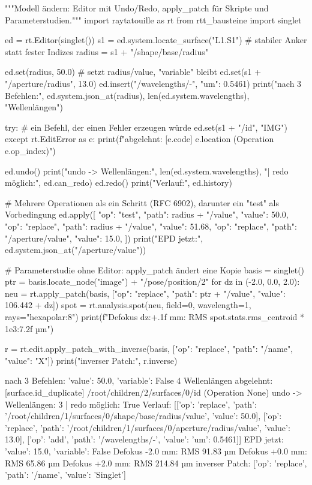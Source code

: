 \documentclass[11pt,a4paper,openany]{book}
\DeclareRobustCommand{\code}[1]{\texttt{\directlua{rttcode("\luaescapestring{\detokenize{#1}}")}}}
\begin{document}
\begin{pycode}[title={\code{ex04_aendern.py}}]
"""Modell ändern: Editor mit Undo/Redo, apply_patch für Skripte und Parameterstudien."""
import raytatouille as rt
from rtt_bausteine import singlet

ed = rt.Editor(singlet())
s1 = ed.system.locate_surface("L1.S1")          # stabiler Anker statt fester Indizes
radius = s1 + "/shape/base/radius"

ed.set(radius, 50.0)                            # setzt radius/value, "variable" bleibt
ed.set(s1 + "/aperture/radius", 13.0)
ed.insert("/wavelengths/-", {"um": 0.5461})
print("nach 3 Befehlen:", ed.system.json_at(radius), len(ed.system.wavelengths), "Wellenlängen")

try:                                            # ein Befehl, der einen Fehler erzeugen würde
    ed.set(s1 + "/id", "IMG")
except rt.EditError as e:
    print(f"abgelehnt: [{e.code}] {e.location} (Operation {e.op_index})")

ed.undo()
print("undo -> Wellenlängen:", len(ed.system.wavelengths), "| redo möglich:", ed.can_redo)
ed.redo()
print("Verlauf:", ed.history)

# Mehrere Operationen als ein Schritt (RFC 6902), darunter ein "test" als Vorbedingung
ed.apply([
    {"op": "test", "path": radius + "/value", "value": 50.0},
    {"op": "replace", "path": radius + "/value", "value": 51.68},
    {"op": "replace", "path": "/aperture/value", "value": 15.0},
])
print("EPD jetzt:", ed.system.json_at("/aperture/value"))

# Parameterstudie ohne Editor: apply_patch ändert eine Kopie
basis = singlet()
ptr = basis.locate_node("image") + "/pose/position/2"
for dz in (-2.0, 0.0, 2.0):
    neu = rt.apply_patch(basis, [{"op": "replace", "path": ptr + "/value",
                                  "value": 106.442 + dz}])
    spot = rt.analysis.spot(neu, field=0, wavelength=1, rays="hexapolar:8")
    print(f"Defokus {dz:+.1f} mm: RMS {spot.stats.rms_centroid * 1e3:7.2f} µm")

r = rt.edit.apply_patch_with_inverse(basis, [{"op": "replace", "path": "/name", "value": "X"}])
print("inverser Patch:", r.inverse)
\end{pycode}
\begin{ausgabe}
nach 3 Befehlen: {'value': 50.0, 'variable': False} 4 Wellenlängen
abgelehnt: [surface.id_duplicate] /root/children/2/surfaces/0/id (Operation None)
undo -> Wellenlängen: 3 | redo möglich: True
Verlauf: [[{'op': 'replace', 'path': '/root/children/1/surfaces/0/shape/base/radius/value', 'value': 50.0}], [{'op': 'replace', 'path': '/root/children/1/surfaces/0/aperture/radius/value', 'value': 13.0}], [{'op': 'add', 'path': '/wavelengths/-', 'value': {'um': 0.5461}}]]
EPD jetzt: {'value': 15.0, 'variable': False}
Defokus -2.0 mm: RMS   91.83 µm
Defokus +0.0 mm: RMS   65.86 µm
Defokus +2.0 mm: RMS  214.84 µm
inverser Patch: [{'op': 'replace', 'path': '/name', 'value': 'Singlet'}]
\end{ausgabe}
\end{document}
